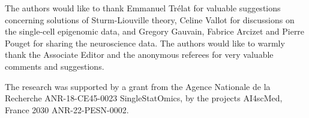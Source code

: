 \documentclass[aos]{imsart}
\theoremstyle{plain}
\theoremstyle{remark}
\newcommand{\1}{1}
\begin{document}
\begin{acks}[Acknowledgments]
	The authors would like to thank Emmanuel Tr\'elat for valuable suggestions concerning solutions of Sturm-Liouville theory, Celine Vallot for discussions on the single-cell epigenomic data, and Gregory Gauvain, Fabrice Arcizet and Pierre Pouget for sharing the neuroscience data. The authors would like to warmly thank the Associate Editor and the anonymous referees for very valuable comments and suggestions.
\end{acks}

\begin{funding}
	The research was supported by a grant from the Agence Nationale de la Recherche ANR-18-CE45-0023 SingleStatOmics, by the projects AI4scMed, France 2030 ANR-22-PESN-0002.
\end{funding}
\end{document}
